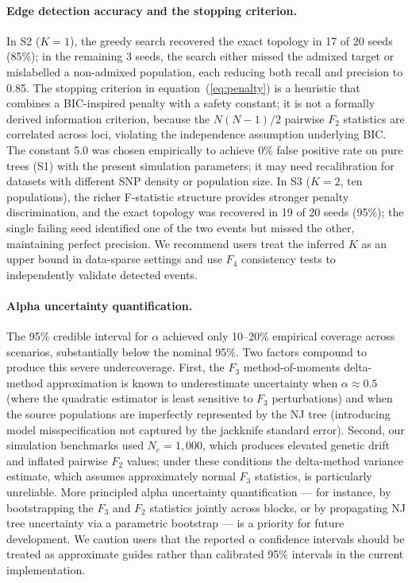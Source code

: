 \paragraph{Edge detection accuracy and the stopping criterion.}
In S2 ($K=1$), the greedy search recovered the exact topology in 17 of 20
seeds (85\%); in the remaining 3 seeds, the search either missed the admixed
target or mislabelled a non-admixed population, each reducing both recall and
precision to 0.85.
The stopping criterion in equation~(\ref{eq:penalty}) is a heuristic that
combines a BIC-inspired penalty with a safety constant; it is not a formally
derived information criterion, because the $N(N-1)/2$ pairwise $F_2$
statistics are correlated across loci, violating the independence assumption
underlying BIC.
The constant 5.0 was chosen empirically to achieve 0\% false positive rate
on pure trees (S1) with the present simulation parameters; it may need
recalibration for datasets with different SNP density or population size.
In S3 ($K=2$, ten populations), the richer F-statistic structure provides
stronger penalty discrimination, and the exact topology was recovered in 19 of
20 seeds (95\%); the single failing seed identified one of the two events
but missed the other, maintaining perfect precision.
We recommend users treat the inferred $K$ as an upper bound in data-sparse
settings and use $F_4$ consistency tests \citep{Patterson2012} to
independently validate detected events.

\paragraph{Alpha uncertainty quantification.}
The 95\% credible interval for $\alpha$ achieved only 10--20\% empirical
coverage across scenarios, substantially below the nominal 95\%.
Two factors compound to produce this severe undercoverage.
First, the $F_3$ method-of-moments delta-method approximation is known to
underestimate uncertainty when $\alpha \approx 0.5$ (where the quadratic
estimator is least sensitive to $F_3$ perturbations) and when the
source populations are imperfectly represented by the NJ tree
(introducing model misspecification not captured by the jackknife
standard error).
Second, our simulation benchmarks used $N_e = 1{,}000$, which produces
elevated genetic drift and inflated pairwise $F_2$ values; under these
conditions the delta-method variance estimate, which assumes approximately
normal $F_3$ statistics, is particularly unreliable.
More principled alpha uncertainty quantification --- for instance, by
bootstrapping the $F_3$ and $F_2$ statistics jointly across blocks, or by
propagating NJ tree uncertainty via a parametric bootstrap --- is a priority
for future development.
We caution users that the reported $\alpha$ confidence intervals should
be treated as approximate guides rather than calibrated 95\% intervals
in the current implementation.

